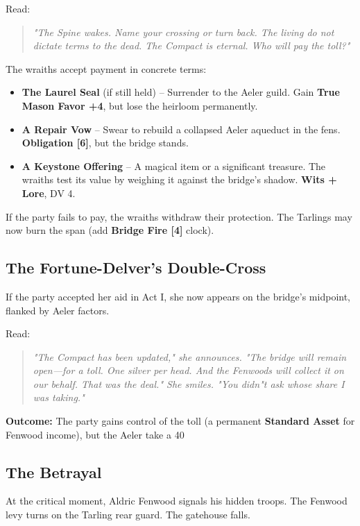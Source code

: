 \documentclass[11pt]{book}
\begin{document}
Read:
\begin{quote}
\emph{"The Spine wakes. Name your crossing or turn back. The living do not dictate terms to the dead. The Compact is eternal. Who will pay the toll?"}
\end{quote}

The wraiths accept payment in concrete terms:
\begin{itemize}
    \item \textbf{The Laurel Seal} (if still held) -- Surrender to the Aeler guild. Gain \textbf{True Mason Favor +4}, but lose the heirloom permanently.
    \item \textbf{A Repair Vow} -- Swear to rebuild a collapsed Aeler aqueduct in the fens. \textbf{Obligation [6]}, but the bridge stands.
    \item \textbf{A Keystone Offering} -- A magical item or a significant treasure. The wraiths test its value by weighing it against the bridge's shadow. \textbf{Wits + Lore}, DV 4.
\end{itemize}
If the party fails to pay, the wraiths withdraw their protection. The Tarlings may now burn the span (add \textbf{Bridge Fire [4]} clock).

\subsection*{The Fortune-Delver's Double-Cross}
If the party accepted her aid in Act I, she now appears on the bridge's midpoint, flanked by Aeler factors.

Read:
\begin{quote}
\emph{"The Compact has been updated," she announces. "The bridge will remain open---for a toll. One silver per head. And the Fenwoods will collect it on our behalf. That was the deal." She smiles. "You didn"t ask whose share I was taking."}
\end{quote}

\textbf{Outcome:} The party gains control of the toll (a permanent \textbf{Standard Asset} for Fenwood income), but the Aeler take a 40%

\subsection*{The Betrayal}
At the critical moment, Aldric Fenwood signals his hidden troops. The Fenwood levy turns on the Tarling rear guard. The gatehouse falls.
\end{document}
